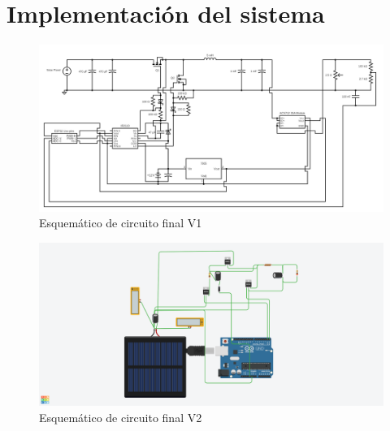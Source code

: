 \section{Implementación del sistema}
\begin{figure}
    \centering
    \includegraphics[width=1\linewidth,frame]{imagenes/finalcircuit.png}
    \caption{Esquemático de circuito final V1}
    \label{fig:circuito_final_circuit_diagram_org}
\end{figure}
\begin{figure}
    \centering
    \includegraphics[width=1\linewidth,frame]{imagenes/testdecircuitoonline.png}
    \caption{Esquemático de circuito final V2}
    \label{fig:circuito_final_de_mentira}
\end{figure}